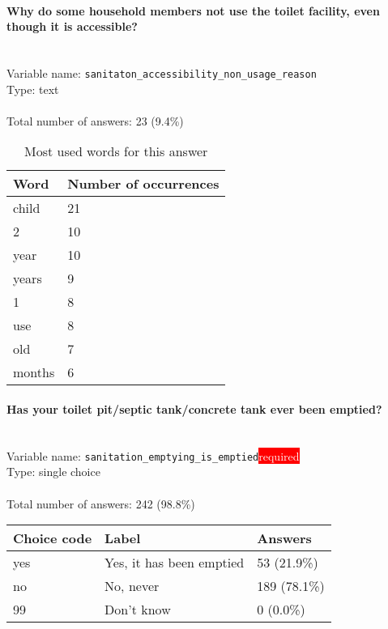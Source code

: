 \documentclass[11.5pt, a4paper]{scrartcl}
\begin{document}
\paragraph{Why do some household members not use the toilet facility, even though it is accessible?}
\  \\Variable name: \texttt{sanitaton\_accessibility\_non\_usage\_reason}\\
Type: text\\
\\Total number of answers: 23 (9.4\%)
\\[0.2em]\begin{table}[H]
 \begin{tabular}{p{4cm}|p{8cm}}
Word & Number of occurrences  \\
\hline
\cellcolor{mygray}child&\cellcolor{mygray}21\\
\hline
2&10\\
\hline
\cellcolor{mygray}year&\cellcolor{mygray}10\\
\hline
years&9\\
\hline
\cellcolor{mygray}1&\cellcolor{mygray}8\\
\hline
use&8\\
\hline
\cellcolor{mygray}old&\cellcolor{mygray}7\\
\hline
months&6\\
\hline
\end{tabular}
\caption{\label{tab:table-name} Most used words for this answer}
\end{table}
\paragraph{Has your toilet pit/septic tank/concrete tank ever been emptied? }
\  \\Variable name: \texttt{sanitation\_emptying\_is\_emptied}\hfill\colorbox{red}{\small{\textcolor{white}{required}}}\\
 Type: single choice\\
\\Total number of answers: 242 (98.8\%)
\\[0.2em] \begin{tabular}{p{4cm}|p{8cm}|p{3cm}}
Choice code & Label & Answers \\
\hline
yes & Yes, it has been emptied& \cellcolor{color1}53 (21.9\%)\\
\cellcolor{mygray} no & \cellcolor{mygray}No, never & \cellcolor{color3}189 (78.1\%)\\
99 & Don’t know& \cellcolor{color0}0 (0.0\%)\\
\end{tabular}
\end{document}
